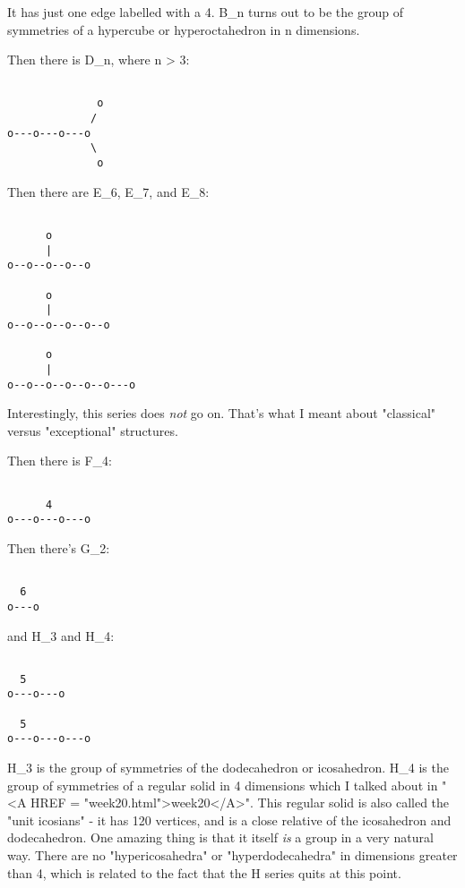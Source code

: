 It has just one edge labelled with a 4.   B_{n} turns out to be
the group of symmetries of a hypercube or hyperoctahedron in n
dimensions.  

Then there is D_{n}, where n > 3:


\begin{verbatim}

              o
             /
o---o---o---o
             \
              o
\end{verbatim}
    

Then there are E_{6}, E_{7}, and E_{8}:


\begin{verbatim}

      o
      |
o--o--o--o--o

      o
      |
o--o--o--o--o--o

      o
      | 
o--o--o--o--o--o---o
\end{verbatim}
    

Interestingly, this series does \emph{not} go on.  That's what I meant
about "classical" versus "exceptional" structures.  

Then there is F_{4}:


\begin{verbatim}

      4
o---o---o---o
\end{verbatim}
    

Then there's G_{2}:


\begin{verbatim}

  6
o---o
\end{verbatim}
    

and H_{3} and H_{4}:


\begin{verbatim}

  5
o---o---o

  5
o---o---o---o
\end{verbatim}
    


H_{3} is the group of symmetries of the dodecahedron or
icosahedron.  H_{4} is the group of symmetries of a regular
solid in 4 dimensions which I talked about in "<A HREF =
"week20.html">week20</A>".  This regular solid is also
called the "unit icosians" - it has 120 vertices, and is a
close relative of the icosahedron and dodecahedron.  One amazing thing
is that it itself \emph{is} a group in a very natural way.  There are no
"hypericosahedra" or "hyperdodecahedra" in
dimensions greater than 4, which is related to the fact that the H
series quits at this point.

